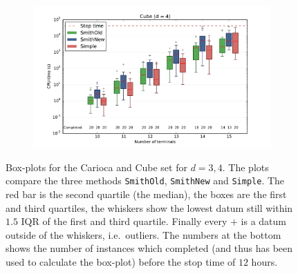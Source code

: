 \begin{figure}[htbp]
\begin{subfigure}[t]{0.5\textwidth}
  \end{subfigure}%
  \begin{subfigure}[t]{0.5\textwidth}
    \includegraphics[width=\textwidth]{gfx/boxplots/plot_nvst_boxplot_d4_Cube_1}
  \end{subfigure}%
  \caption[Box-plots: \texttt{SmithOld} vs.\ \texttt{SmithNew} vs.\
  \texttt{Simple}]{Box-plots for the Carioca and Cube set for $d = 3, 4$. The
    plots compare the three methods \texttt{SmithOld}, \texttt{SmithNew} and
    \texttt{Simple}. The red bar is the second quartile (the median), the boxes
    are the first and third quartiles, the whiskers show the lowest datum still
    within $1.5$ IQR of the first and third quartile. Finally every $+$ is a datum
    outside of the whiskers, i.e.\ outliers. The numbers at the bottom shows the
    number of instances which completed (and thus has been used to calculate the
    box-plot) before the stop time of $12$ hours.\label{fig:boxplots-1}}
\end{figure}


